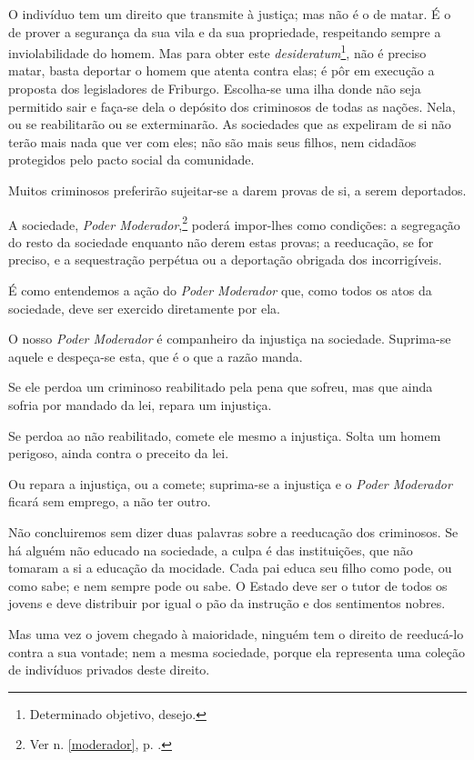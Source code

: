 O indivíduo tem um direito que transmite à justiça; mas não é o de
matar. É o de prover a segurança da sua vila e da sua propriedade,
respeitando sempre a inviolabilidade do homem. Mas para obter este
\emph{desideratum}\footnote{Determinado objetivo, desejo.}, não é
preciso matar, basta deportar o homem que atenta contra elas; é pôr em
execução a proposta dos legisladores de Friburgo. Escolha-se uma ilha
donde não seja permitido sair e faça-se dela o depósito dos criminosos
de todas as nações. Nela, ou se reabilitarão ou se exterminarão. As
sociedades que as expeliram de si não terão mais nada que ver com eles;
não são mais seus filhos, nem cidadãos protegidos pelo pacto social da
comunidade.

Muitos criminosos preferirão sujeitar-se a darem provas de si, a serem
deportados.

A sociedade, \emph{Poder Moderador},\footnote{Ver n. \ref{moderador}, p. 
\pageref{moderador}.} poderá impor-lhes como condições: a segregação 
do resto da sociedade enquanto não derem estas provas; a reeducação, 
se for preciso, e a sequestração perpétua ou a deportação obrigada dos incorrigíveis.

É como entendemos a ação do \emph{Poder Moderador} que, como todos os
atos da sociedade, deve ser exercido diretamente por ela.

O nosso \emph{Poder Moderador} é companheiro da injustiça na sociedade.
Suprima-se aquele e despeça-se esta, que é o que a razão manda.

Se ele perdoa um criminoso reabilitado pela pena que sofreu, mas que
ainda sofria por mandado da lei, repara um injustiça.

Se perdoa ao não reabilitado, comete ele mesmo a injustiça. Solta um
homem perigoso, ainda contra o preceito da lei.

Ou repara a injustiça, ou a comete; suprima-se a injustiça e o
\emph{Poder Moderador} ficará sem emprego, a não ter outro.

Não concluiremos sem dizer duas palavras sobre a reeducação dos
criminosos. Se há alguém não educado na sociedade, a culpa é das
instituições, que não tomaram a si a educação da mocidade. Cada pai
educa seu filho como pode, ou como sabe; e nem sempre pode ou sabe. O
Estado deve ser o tutor de todos os jovens e deve distribuir por igual o
pão da instrução e dos sentimentos nobres.

Mas uma vez o jovem chegado à maioridade, ninguém tem o direito de
reeducá-lo contra a sua vontade; nem a mesma sociedade, porque ela
representa uma coleção de indivíduos privados deste direito.

